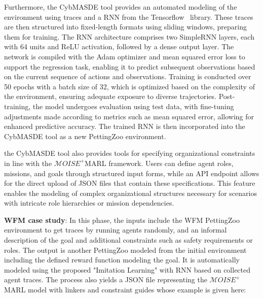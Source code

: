 \documentclass[conference]{IEEEtran}
\begin{document}
Furthermore, the CybMASDE tool provides an automated modeling of the environment using traces and a RNN from the Tensorflow~\cite{tensorflow2015-whitepaper} library.
These traces are then structured into fixed-length formats using sliding windows, preparing them for training. The RNN architecture comprises two SimpleRNN layers, each with 64 units and ReLU activation, followed by a dense output layer. The network is compiled with the Adam optimizer and mean squared error loss to support the regression task, enabling it to predict subsequent observations based on the current sequence of actions and observations. Training is conducted over 50 epochs with a batch size of 32, which is optimized based on the complexity of the environment, ensuring adequate exposure to diverse trajectories. Post-training, the model undergoes evaluation using test data, with fine-tuning adjustments made according to metrics such as mean squared error, allowing for enhanced predictive accuracy. The trained RNN is then incorporated into the CybMASDE tool as a new PettingZoo environment.

the CybMASDE tool also provides tools for specifying organizational constraints in line with the $\mathcal{M}OISE^+$MARL framework. Users can define agent roles, missions, and goals through structured input forms, while an API endpoint allows for the direct upload of JSON files that contain these specifications. This feature enables the modeling of complex organizational structures necessary for scenarios with intricate role hierarchies or mission dependencies.

\textbf{WFM case study}: In this phase, the inputs include the WFM PettingZoo environment to get traces by running agents randomly, and an informal description of the goal and additional constraints such as safety requirements or roles.
The output is another PettingZoo modeled from the initial environment including the defined reward function modeling the goal. It is automatically modeled using the proposed "Imitation Learning" with RNN based on collected agent traces. The process also yields a JSON file representing the $\mathcal{M}OISE^+$MARL model with linkers and constraint guides whose example is given here:
\end{document}
